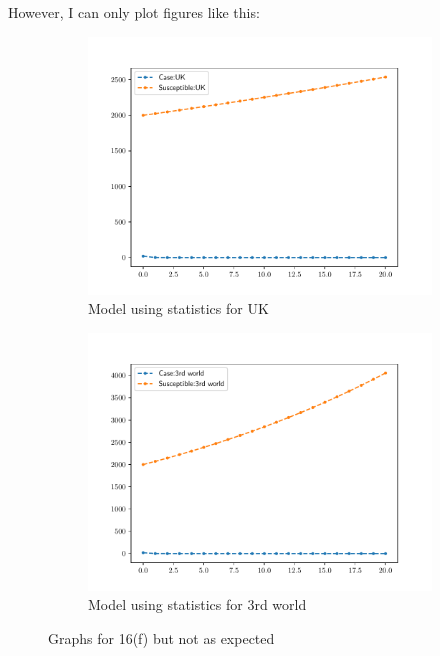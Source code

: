 \begin{homeworkProblem}
However, I can only plot figures like this:
\begin{figure}[htbp]
    \begin{subfigure}{0.4\linewidth}
    \includegraphics[scale=0.6]{fig/fig16(f)(1).pdf}
    \caption{Model using statistics for UK}
    \end{subfigure}
    \hfill
    \begin{subfigure}{0.4\linewidth}
    \includegraphics[scale=0.6]{fig/fig16(f)(2).pdf}
    \caption{Model using statistics for 3rd world}
    \end{subfigure}
    \caption{Graphs for 16(f) but not as expected}
\end{figure}


\end{homeworkProblem}